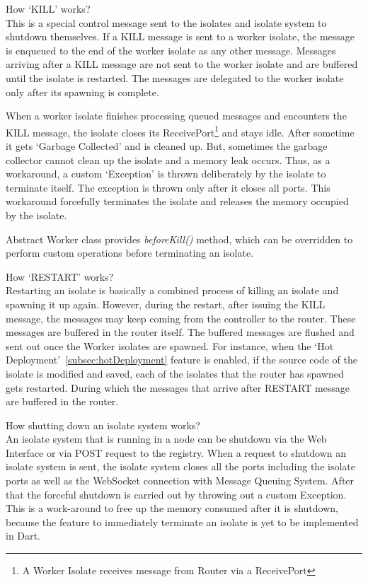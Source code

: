 \begin{description}
    \item \label{itm:killWorking} How ‘KILL’ works?\\
    This is a special control message sent to the isolates and isolate system to shutdown themselves. If a KILL message is sent to a worker isolate, the message is enqueued to the end of the worker isolate as any other message. Messages arriving after a KILL message are not sent to the worker isolate and are buffered until the isolate is restarted. The messages are delegated to the worker isolate only after its spawning is complete.

    When a worker isolate finishes processing queued messages and encounters the KILL message, the isolate closes its ReceivePort\footnote{A Worker Isolate receives message from Router via a ReceivePort} and stays idle. After sometime it gets ‘Garbage Collected’ and is cleaned up. But, sometimes the garbage collector cannot clean up the isolate and a memory leak occurs. Thus, as a workaround, a custom ‘Exception’ is thrown deliberately by the isolate to terminate itself. The exception is thrown only after it closes all ports. This workaround forcefully terminates the isolate and releases the memory occupied by the isolate.

    Abstract Worker class provides \emph{beforeKill()} method, which can be overridden to perform custom operations before terminating an isolate.

    \item How ‘RESTART’ works?\\
    Restarting an isolate is basically a combined process of killing an isolate and spawning it up again. However, during the restart, after issuing the KILL message, the messages may keep coming from the controller to the router. These messages are buffered in the router itself. The buffered messages are flushed and sent out once the Worker isolates are spawned. For instance, when the ‘Hot Deployment’~\autoref{subsec:hotDeployment} feature is enabled, if the source code of the isolate is modified and saved, each of the isolates that the router has spawned gets restarted. During which the messages that arrive after RESTART message are buffered in the router.

    \item How shutting down an isolate system works?\\
    An isolate system that is running in a node can be shutdown via the Web Interface or via POST request to the registry. When a request to shutdown an isolate system is sent, the isolate system closes all the ports including the isolate ports as well as the WebSocket connection with Message Queuing System. After that the forceful shutdown is carried out by throwing out a custom Exception. This is a work-around to free up the memory consumed after it is shutdown, because the feature to immediately terminate an isolate is yet to be implemented in Dart.
  \end{description}

